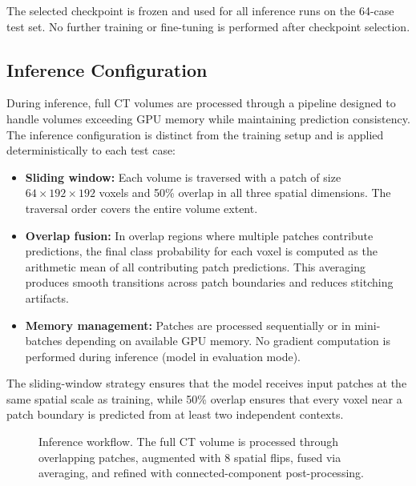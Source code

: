 The selected checkpoint is frozen and used for all inference runs on the 64-case test set. No further training or fine-tuning is performed after checkpoint selection.

\subsection{Inference Configuration}

During inference, full CT volumes are processed through a pipeline designed to handle volumes exceeding GPU memory while maintaining prediction consistency. The inference configuration is distinct from the training setup and is applied deterministically to each test case:

\begin{itemize}
    \item \textbf{Sliding window:} Each volume is traversed with a patch of size $64 \times 192 \times 192$ voxels and 50\% overlap in all three spatial dimensions. The traversal order covers the entire volume extent.
    \item \textbf{Overlap fusion:} In overlap regions where multiple patches contribute predictions, the final class probability for each voxel is computed as the arithmetic mean of all contributing patch predictions. This averaging produces smooth transitions across patch boundaries and reduces stitching artifacts.
    \item \textbf{Memory management:} Patches are processed sequentially or in mini-batches depending on available GPU memory. No gradient computation is performed during inference (model in evaluation mode).
\end{itemize}

The sliding-window strategy ensures that the model receives input patches at the same spatial scale as training, while 50\% overlap ensures that every voxel near a patch boundary is predicted from at least two independent contexts.

\begin{figure}[!t]
\centering
\caption{Inference workflow. The full CT volume is processed through overlapping patches, augmented with 8 spatial flips, fused via averaging, and refined with connected-component post-processing.}
\label{fig:inference}
\end{figure}


